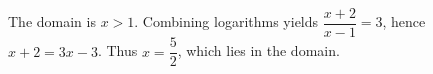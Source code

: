 The domain is $x>1$. Combining logarithms yields $\dfrac{x+2}{x-1}=3$, hence $x+2=3x-3$. Thus $\boxed{x=\dfrac{5}{2}}$, which lies in the domain.
